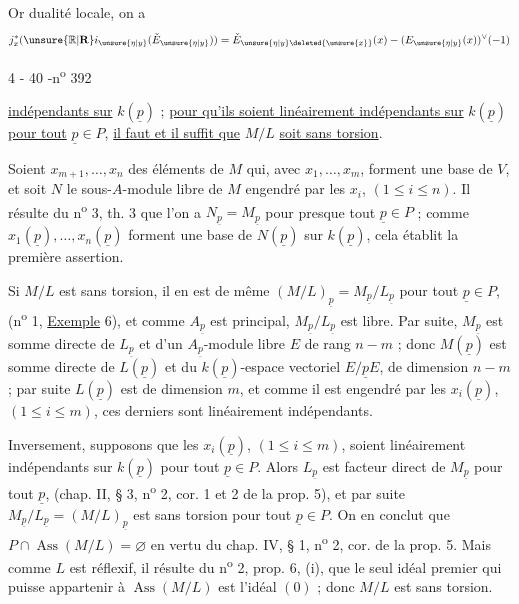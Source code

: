 Or  dualité locale, on a 
\[
j_x^*(\unsure{\mathbb{R}|\mathbf{R}}i_{\unsure{\eta|y}}(\check E_{\unsure{\eta|y}}))=\check E_{\unsure{\eta|y}\deleted{\unsure{x}}}(x)-(E_{\unsure{\eta|y}}(x))^\vee(-1)
\]

\begin{center}4 - 40 -\hfill n\textsuperscript{o} 392\end{center}

\uline{indépendants sur} $k(\underline{p})$ ; \uline{pour qu'ils soient linéairement indépendants sur} $k(\underline{p})$ \uline{pour tout} $\underline{p}\in P$, \uline{il faut et il suffit que} $M/L$ \uline{soit sans torsion}.

Soient $x_{m+1},\ldots,x_n$ des éléments de $M$ qui, avec $x_1,\ldots,x_m$, forment une base de $V$, et soit $N$ le sous-$A$-module libre de $M$ engendré par les $x_i$, $(1\le i\le n)$. Il résulte du n\textsuperscript{o} 3, th. 3 que l'on a $N_{\underline{p}}=M_{\underline{p}}$ pour presque tout $\underline{p}\in P$ ; comme $x_1(\underline{p}),\ldots,x_n(\underline{p})$ forment une base de $N(\underline{p})$ sur $k(\underline{p})$, cela établit la première assertion.

Si $M/L$ est sans torsion, il en est de même  $(M/L)_{\underline{p}}=M_{\underline{p}}/L_{\underline{p}}$ pour tout $\underline{p}\in P$, (n\textsuperscript{o} 1, \uline{Exemple} 6), et comme $A_{\underline{p}}$ est principal, $M_{\underline{p}}/L_{\underline{p}}$ est libre. Par suite, $M_{\underline{p}}$ est somme directe de $L_{\underline{p}}$ et d'un $A_{\underline{p}}$-module libre $E$ de rang $n-m$ ; donc $M(\underline{p})$ est somme directe de $L(\underline{p})$ et du $k(\underline{p})$-espace vectoriel $E/\underline{p}E$, de dimension $n-m$ ; par suite $L(\underline{p})$ est de dimension $m$, et comme il est engendré par les $x_i(\underline{p})$, $(1\le i\le m)$, ces derniers sont linéairement indépendants.

Inversement, supposons que les $x_i(\underline{p})$, $(1\le i\le m)$, soient linéairement indépendants sur $k(\underline{p})$ pour tout $\underline{p}\in P$. Alors $L_{\underline{p}}$ est facteur direct de $M_{\underline{p}}$ pour tout $\underline{p}$, (chap. II, § 3, n\textsuperscript{o} 2, cor. 1 et 2 de la prop. 5), et par suite $M_{\underline{p}}/L_{\underline{p}}=(M/L)_{\underline{p}}$ est sans torsion pour tout $\underline{p}\in P$. On en conclut que $P\cap\operatorname{Ass}(M/L)=\varnothing$ en vertu du chap. IV, § 1, n\textsuperscript{o} 2, cor. de la prop. 5. Mais comme $L$ est réflexif, il résulte du n\textsuperscript{o} 2, prop. 6, (i), que le seul idéal premier qui puisse appartenir à $\operatorname{Ass}(M/L)$ est l'idéal $(0)$ ; donc $M/L$ est sans torsion.

